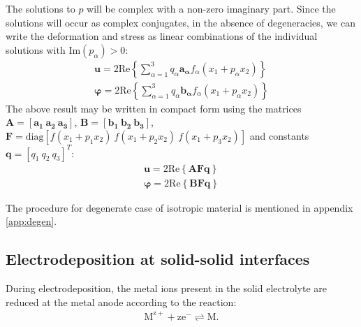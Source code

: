 \documentclass[%
reprint,
 amsmath,amssymb,
 aps,
 prb,
]{revtex4-1}
\newcommand*{\rtten}[1]{\mathbf{\boldsymbol{#1}}}
\newcommand*{\rtvec}[1]{\mathbf{#1}}
\begin{document}
The solutions to $p$ will be complex with a non-zero imaginary part. Since the solutions will occur as complex conjugates, in the absence of degeneracies, we can write the deformation and stress as linear combinations of the individual solutions with Im$(p_\alpha)>0$:
\begin{subequations}\label{eq:ustrresult}
\begin{eqnarray}
\rtvec{u}=2\text{Re}\left\{\sum_{\alpha=1}^3 q_{\alpha} \rtvec{a_{\alpha}} f_{\alpha}(x_1+p_{\alpha} x_2)\right\}\\
\rtvec{\varphi}=2\text{Re}\left\{\sum_{\alpha=1}^3 q_{\alpha} \rtvec{b_{\alpha}} f_{\alpha}(x_1+p_{\alpha} x_2)\right\}
\end{eqnarray}
\end{subequations}
The above result may be written in compact form using the matrices $\rtten{A}=[\rtvec{a_1}\  \rtvec{a_2}\  \rtvec{a_3}]$,  $\rtten{B}=[\rtvec{b_1}\  \rtvec{b_2}\  \rtvec{b_3}]$, $\rtten{F}=\text{diag}[f(x_1+p_1x_2)\ f(x_1+p_2x_2)\ f(x_1+p_3x_2)]$ and constants $\rtvec{q}=[q_1\ q_2\ q_3]^T$:
\begin{subequations}\label{eq:ustresultmat}
\begin{eqnarray}
\rtvec{u}=2\text{Re}\left\{ \rtten{A}\rtten{F}\rtvec{q} \right\}\\
\rtvec{\varphi}=2\text{Re}\left\{ \rtten{B}\rtten{F}\rtvec{q} \right\}
\end{eqnarray}
\end{subequations}

The procedure for degenerate case of isotropic material is mentioned in appendix \ref{app:degen}.

\subsection{Electrodeposition at solid-solid interfaces}
During electrodeposition, the metal ions present in the solid electrolyte are reduced at the metal anode according to the reaction:
\begin{eqnarray}\label{eq:reaction}
\mathrm{{M}^{z+}+ze^{-}}\rightleftharpoons\mathrm{M}.
\end{eqnarray}
\end{document}
